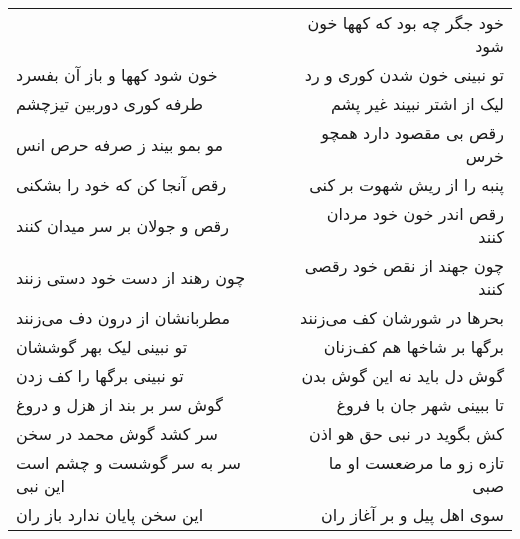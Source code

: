 \begin{center}
\begin{longtable}{l p{0.5cm} r}
&&
خود جگر چه بود که کهها خون شود
\\
خون شود کهها و باز آن بفسرد
&&
تو نبینی خون شدن کوری و رد
\\
طرفه کوری دوربین تیزچشم
&&
لیک از اشتر نبیند غیر پشم
\\
مو بمو بیند ز صرفه حرص انس
&&
رقص بی مقصود دارد همچو خرس
\\
رقص آنجا کن که خود را بشکنی
&&
پنبه را از ریش شهوت بر کنی
\\
رقص و جولان بر سر میدان کنند
&&
رقص اندر خون خود مردان کنند
\\
چون رهند از دست خود دستی زنند
&&
چون جهند از نقص خود رقصی کنند
\\
مطربانشان از درون دف می‌زنند
&&
بحرها در شورشان کف می‌زنند
\\
تو نبینی لیک بهر گوششان
&&
برگها بر شاخها هم کف‌زنان
\\
تو نبینی برگها را کف زدن
&&
گوش دل باید نه این گوش بدن
\\
گوش سر بر بند از هزل و دروغ
&&
تا ببینی شهر جان با فروغ
\\
سر کشد گوش محمد در سخن
&&
کش بگوید در نبی حق هو اذن
\\
سر به سر گوشست و چشم است این نبی
&&
تازه زو ما مرضعست او ما صبی
\\
این سخن پایان ندارد باز ران
&&
سوی اهل پیل و بر آغاز ران
\\
\end{longtable}
\end{center}
